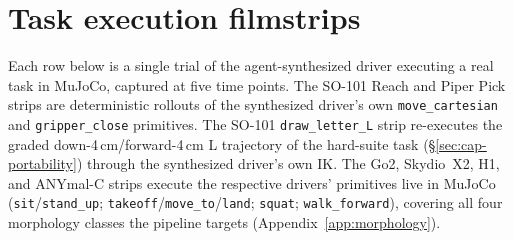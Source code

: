 \section{Task execution filmstrips}
\label{app:filmstrips}

Each row below is a single trial of the agent-synthesized driver
executing a real task in MuJoCo, captured at five time points. The
SO-101 Reach and Piper Pick strips are deterministic rollouts of
the synthesized driver's own \texttt{move\_cartesian} and
\texttt{gripper\_close} primitives. The SO-101 \texttt{draw\_letter\_L}
strip re-executes the graded down-4\,cm/forward-4\,cm L trajectory
of the hard-suite task (\S\ref{sec:cap-portability}) through the
synthesized driver's own IK. The Go2, Skydio~X2, H1, and
ANYmal-C strips execute the respective drivers' primitives live in
MuJoCo (\texttt{sit}/\texttt{stand\_up};
\texttt{takeoff}/\texttt{move\_to}/\texttt{land}; \texttt{squat};
\texttt{walk\_forward}), covering all four morphology classes the
pipeline targets (Appendix~\ref{app:morphology}).

